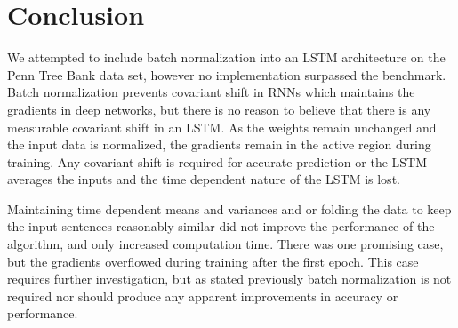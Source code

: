 \documentclass[]{article}
\begin{document}
\section*{Conclusion}
We attempted to include batch normalization into an LSTM architecture on the Penn Tree Bank data set, however no implementation surpassed the benchmark. Batch normalization prevents covariant shift in RNNs which maintains the gradients in deep networks, but there is no reason to believe that there is any measurable covariant shift in an LSTM. As the weights remain unchanged and the input data is normalized, the gradients remain in the active region during training. Any covariant shift is required for accurate prediction or the LSTM averages the inputs and the time dependent nature of the LSTM is lost. 

Maintaining time dependent means and variances and or folding the data to keep the input sentences reasonably similar did not improve the performance of the algorithm, and only increased computation time. There was one promising case, but the gradients overflowed during training after the first epoch. This case requires further investigation, but as stated previously batch normalization is not required nor should produce any apparent improvements in accuracy or performance. 
{}

\end{document}
